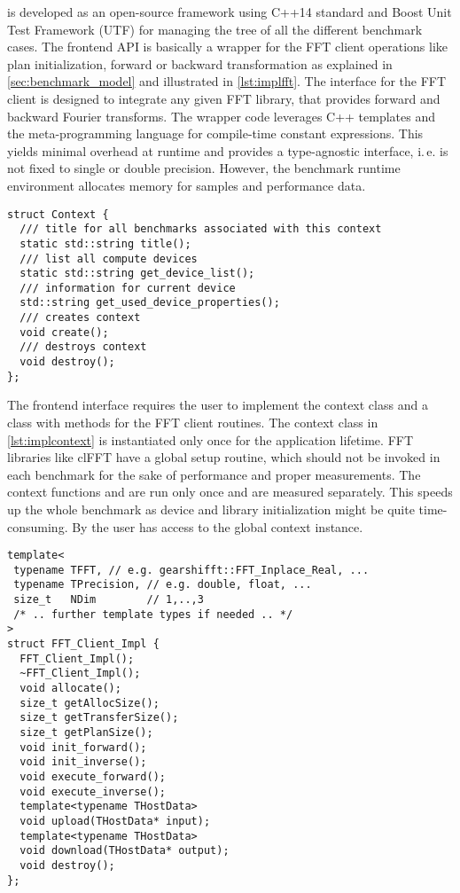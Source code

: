 

\gearshifft{} is developed as an open-source framework using C++14 standard and Boost Unit Test Framework (UTF) for managing the tree of all the different benchmark cases.
The frontend API is basically a wrapper for the FFT client operations like plan initialization, forward or backward transformation as explained in \cref{sec:benchmark_model} and illustrated in \cref{lst:implfft}.
The interface for the FFT client is designed to integrate any given FFT library, that provides forward and backward Fourier transforms.
The wrapper code leverages C++ templates and the meta-programming language for compile-time constant expressions.
This yields minimal overhead at runtime and provides a type-agnostic interface, i.\,e. \gearshifft{} is not fixed to single or double precision.
However, the benchmark runtime environment allocates memory for samples and performance data.

\begin{lstlisting}[caption={Context class required by gearshifft frontend API},label={lst:implcontext}]
struct Context {
  /// title for all benchmarks associated with this context
  static std::string title();
  /// list all compute devices
  static std::string get_device_list();
  /// information for current device
  std::string get_used_device_properties();
  /// creates context
  void create();
  /// destroys context
  void destroy();
};
\end{lstlisting}

The frontend interface requires the user to implement the context class and a class with methods for the FFT client routines.
The context class in \cref{lst:implcontext} is instantiated only once for the application lifetime.
FFT libraries like clFFT have a global setup routine, which should not be invoked in each benchmark for the sake of performance and proper measurements. 
The context functions  and  are run only once and are measured separately.
This speeds up the whole benchmark as device and library initialization might be quite time-consuming. 
By  the user has access to the global context instance.

\begin{lstlisting}[caption={FFT client implementation required by gearshifft frontend API},label={lst:implfft}]
template<
 typename TFFT, // e.g. gearshifft::FFT_Inplace_Real, ...
 typename TPrecision, // e.g. double, float, ...
 size_t   NDim        // 1,..,3
 /* .. further template types if needed .. */
>
struct FFT_Client_Impl {
  FFT_Client_Impl();
  ~FFT_Client_Impl();
  void allocate();
  size_t getAllocSize();
  size_t getTransferSize();
  size_t getPlanSize();
  void init_forward();
  void init_inverse();
  void execute_forward();
  void execute_inverse();
  template<typename THostData>
  void upload(THostData* input);
  template<typename THostData>
  void download(THostData* output);
  void destroy();
};
\end{lstlisting}

